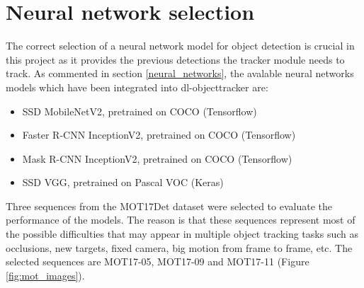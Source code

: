 \section{Neural network selection}
The correct selection of a neural network model for object detection is crucial in this project as it provides the previous detections the tracker module needs to track. As commented in section \ref{neural_networks}, the avalable neural networks models which have been integrated into dl-objecttracker are:
\begin{itemize}
    \item SSD MobileNetV2, pretrained on COCO (Tensorflow)
    \item Faster R-CNN InceptionV2, pretrained on COCO (Tensorflow)
    \item Mask R-CNN InceptionV2, pretrained on COCO (Tensorflow)
    \item SSD VGG, pretrained on Pascal VOC (Keras)
\end{itemize}
Three sequences from the MOT17Det dataset were selected to evaluate the performance of the models. The reason is that these sequences represent most of the possible difficulties that may appear in multiple object tracking tasks such as occlusions, new targets, fixed camera, big motion from frame to frame, etc. The selected sequences are MOT17-05, MOT17-09 and MOT17-11 (Figure \ref{fig:mot_images})\label{selected_sequences}.\\
